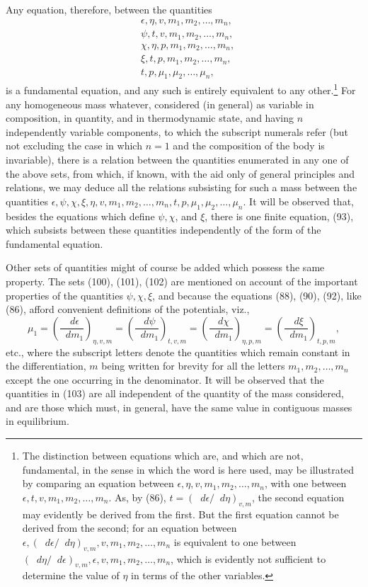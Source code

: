 \documentclass[11pt]{article}
\newcommand{\dd}{\mathop{}\!d}
\newcommand{\eps}{\epsilon}
\begin{document}
Any equation, therefore, between the quantities
\begin{align}
&\eps,\eta,v,m_1,m_2,\ldots,m_n,\\
&\psi,t,v,m_1,m_2,\ldots,m_n,\\
&\chi,\eta,p,m_1,m_2,\ldots,m_n,\\
&\xi,t,p,m_1,m_2,\ldots,m_n,\\
&t,p,\mu_1,\mu_2,\ldots,\mu_n,
\end{align}
is a fundamental equation, and any such is entirely equivalent to any other.\footnote{The distinction between equations which are, and which are not, fundamental, in the sense in which the word is here used, may be illustrated by comparing an equation between \(\eps,\eta,v,m_1,m_2,\ldots,m_n\), with one between \(\eps,t,v,m_1,m_2,\ldots,m_n\). As, by (86), \(t=(\dd\eps/\dd\eta)_{v,m}\), the second equation may evidently be derived from the first. But the first equation cannot be derived from the second; for an equation between \(\eps,(\dd\eps/\dd\eta)_{v,m},v,m_1,m_2,\ldots,m_n\) is equivalent to one between \((\dd\eta/\dd\eps)_{v,m},\eps,v,m_1,m_2,
\ldots,m_n\), which is evidently not sufficient to determine the value of \(\eta\) in terms of the other variables.} For any homogeneous mass whatever, considered (in general) as variable in composition, in quantity, and in thermodynamic state, and having \(n\) independently variable components, to which the subscript numerals refer (but not excluding the case in which \(n=1\) and the composition of the body is invariable), there is a relation between the quantities enumerated in any one of the above sets, from which, if known, with the aid only of general principles and relations, we may deduce all the relations subsisting for such a mass between the quantities \(\eps,\psi,\chi,\xi,\eta,v,m_1,m_2,\ldots,m_n,t,p,\mu_1,\mu_2,
\ldots,\mu_n\). It will be observed that, besides the equations which define \(\psi,\chi\), and \(\xi\), there is one finite equation, (93), which subsists between these quantities independently of the form of the fundamental equation.

Other sets of quantities might of course be added which possess the same property. The sets (100), (101), (102) are mentioned on account of the important properties of the quantities \(\psi,\chi,\xi\), and because the equations (88), (90), (92), like (86), afford convenient definitions of the potentials, viz.,
\begin{equation}
\mu_1=
\left(\frac{\dd\eps}{\dd m_1}\right)_{\eta,v,m}
=\left(\frac{\dd\psi}{\dd m_1}\right)_{t,v,m}
=\left(\frac{\dd\chi}{\dd m_1}\right)_{\eta,p,m}
=\left(\frac{\dd\xi}{\dd m_1}\right)_{t,p,m},
\end{equation}
etc., where the subscript letters denote the quantities which remain constant in the differentiation, \(m\) being written for brevity for all the letters \(m_1,m_2,\ldots,m_n\) except the one occurring in the denominator. It will be observed that the quantities in (103) are all independent of the quantity of the mass considered, and are those which must, in general, have the same value in contiguous masses in equilibrium.
\end{document}

